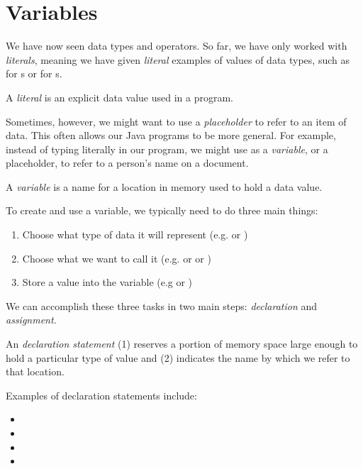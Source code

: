 \section{Variables}
We have now seen data types and operators. So far, we have only worked with \emph{literals}, meaning we have given \emph{literal} examples of values of data types, such as  for s or  for s. 

\begin{definition}
A \emph{literal} is an explicit data value used in a program.
\end{definition}

Sometimes, however, we might want to use a \emph{placeholder} to refer to an item of data. This often allows our Java programs to be more general. For example, instead of typing  literally in our program, we might use  as a \emph{variable}, or a placeholder, to refer to a person's name on a document.

\begin{definition}
A \emph{variable} is a name for a location in memory used to hold a data value.
\end{definition}

\noindent To create and use a variable, we typically need to do three main things: 
\begin{enumerate}
 \item Choose what type of data it will represent (e.g.  or )
 \item Choose what we want to call it (e.g.  or  or ) 
 \item Store a value into the variable (e.g  or )
\end{enumerate}
We can accomplish these three tasks in two main steps: \emph{declaration} and \emph{assignment}.

\begin{definition}
An \emph{declaration statement} (1) reserves a portion of memory space large enough to hold a particular type of value and (2) indicates the name by which we refer to that location.
\end{definition}

\noindent Examples of declaration statements include:
\begin{itemize}
 \item {}
 \item {}
 \item {}
 \item {}
\end{itemize}

